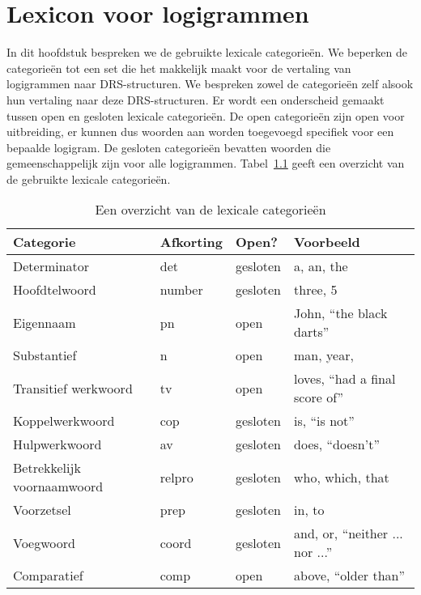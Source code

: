 \chapter{Lexicon voor logigrammen}
In dit hoofdstuk bespreken we de gebruikte lexicale categorieën. We beperken de categorieën tot een set die het makkelijk maakt voor de vertaling van logigrammen naar DRS-structuren. We bespreken zowel de categorieën zelf alsook hun vertaling naar deze DRS-structuren. Er wordt een onderscheid gemaakt tussen open en gesloten lexicale categorieën. De open categorieën zijn open voor uitbreiding, er kunnen dus woorden aan worden toegevoegd specifiek voor een bepaalde logigram. De gesloten categorieën bevatten woorden die gemeenschappelijk zijn voor alle logigrammen. Tabel~\ref{tbl:lexiconCategories} geeft een overzicht van de gebruikte lexicale categorieën.


\begin{table}[t]
  \centering
  \begin{tabular}{llll}
    \toprule
    \textbf{Categorie} & \textbf{Afkorting} & \textbf{Open?} & \textbf{Voorbeeld}  \\ \midrule
    Determinator       & det                & gesloten & a, an, the \\
    Hoofdtelwoord      & number             & gesloten & three, 5      \\
    Eigennaam          & pn                 & open     & John, ``the black darts'' \\
    Substantief        & n                  & open     & man, year, \\
    Transitief werkwoord & tv               & open     & loves, ``had a final score of'' \\
    Koppelwerkwoord    & cop                & gesloten & is, ``is not'' \\
    Hulpwerkwoord      & av                 & gesloten & does, ``doesn't'' \\
    Betrekkelijk voornaamwoord & relpro     & gesloten & who, which, that \\
    Voorzetsel         & prep               & gesloten & in, to \\
    Voegwoord          & coord              & gesloten & and, or, ``neither ... nor ...'' \\
    Comparatief        & comp               & open     & above, ``older than'' \\
    \bottomrule
  \end{tabular}
  \caption{Een overzicht van de lexicale categorieën}
  \label{tbl:lexiconCategories}
\end{table}

